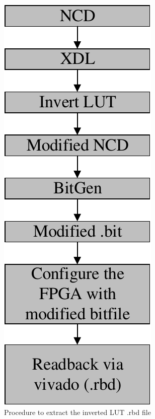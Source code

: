 \begin{figure}[tb!]
 \centering
  \captionsetup{justification=centering}    
   \includegraphics[scale = 0.5]{Figures/inverted-rbd.pdf}
   \caption{Procedure to extract the inverted LUT .rbd file}
\label{fig:inverted-rbd}
\end{figure}


